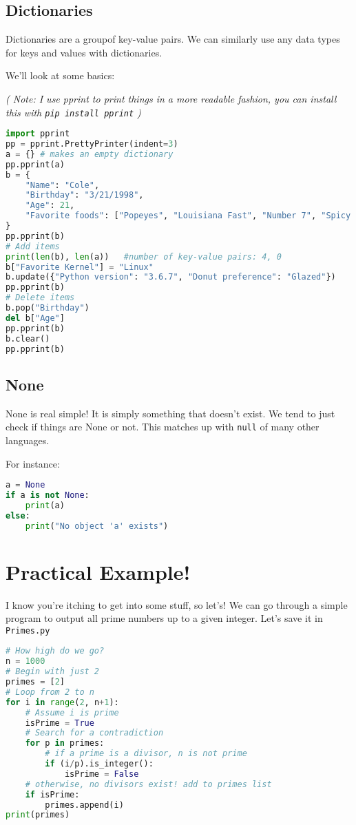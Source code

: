 \documentclass[11pt, twoside, reqno]{book}
\begin{document}
\subsection{Dictionaries}

Dictionaries are a groupof key-value pairs. We can similarly use any data types for keys and values with dictionaries.

We'll look at some basics:

\textit{( Note: I use pprint to print things in a more readable fashion, you can install this with \texttt{pip install pprint} )}
\begin{lstlisting}[language=Python]
import pprint
pp = pprint.PrettyPrinter(indent=3)
a = {} # makes an empty dictionary
pp.pprint(a)
b = {
    "Name": "Cole",
    "Birthday": "3/21/1998",
    "Age": 21,
    "Favorite foods": ["Popeyes", "Louisiana Fast", "Number 7", "Spicy Chicken"]
}
pp.pprint(b)
# Add items
print(len(b), len(a))   #number of key-value pairs: 4, 0
b["Favorite Kernel"] = "Linux"
b.update({"Python version": "3.6.7", "Donut preference": "Glazed"})
pp.pprint(b)
# Delete items
b.pop("Birthday")
del b["Age"]
pp.pprint(b)
b.clear()
pp.pprint(b)
\end{lstlisting}

\subsection{None}

None is real simple! It is simply something that doesn't exist. We tend to just check if things are None or not. This matches up with \texttt{null} of many other languages.

For instance:
\begin{lstlisting}[language=Python]
a = None
if a is not None:
    print(a)
else:
    print("No object 'a' exists")
\end{lstlisting}

\section{Practical Example!}

I know you're itching to get into some stuff, so let's! We can go through a simple program to output all prime numbers up to a given integer. Let's save it in \texttt{Primes.py}
\begin{lstlisting}[language=Python]
# How high do we go?
n = 1000
# Begin with just 2
primes = [2]
# Loop from 2 to n
for i in range(2, n+1):
    # Assume i is prime
    isPrime = True
    # Search for a contradiction
    for p in primes:
        # if a prime is a divisor, n is not prime
        if (i/p).is_integer():
            isPrime = False
    # otherwise, no divisors exist! add to primes list
    if isPrime:
        primes.append(i)
print(primes)
\end{lstlisting}
\end{document}
